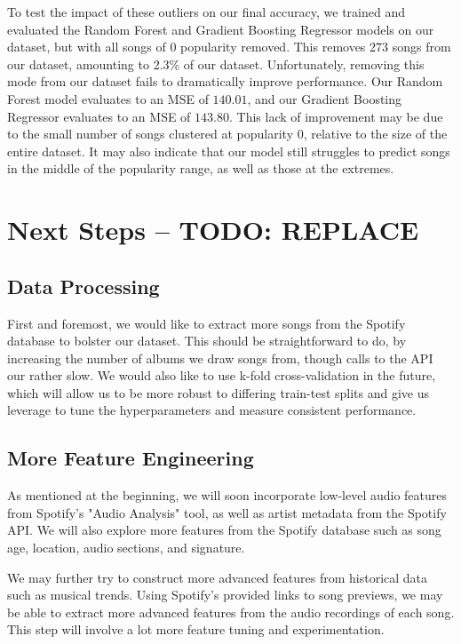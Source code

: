 \documentclass[journal]{IEEEtran}
\begin{document}
To test the impact of these outliers on our final accuracy, we trained and evaluated the Random Forest and Gradient Boosting Regressor models on our dataset, but with all songs of 0 popularity removed. This removes 273 songs from our dataset, amounting to 2.3\% of our dataset. Unfortunately, removing this mode from our dataset fails to dramatically improve performance. Our Random Forest model evaluates to an MSE of $140.01$, and our Gradient Boosting Regressor evaluates to an MSE of $143.80$. This lack of improvement may be due to the small number of songs clustered at popularity 0, relative to the size of the entire dataset. It may also indicate that our model still struggles to predict songs in the middle of the popularity range, as well as those at the extremes.


\section{Next Steps -- TODO: REPLACE}

\subsection{Data Processing}
First and foremost, we would like to extract more songs from the Spotify database to bolster our dataset. This should be straightforward to do, by increasing the number of albums we draw songs from, though calls to the API our rather slow. We would also like to use k-fold cross-validation in the future, which will allow us to be more robust to differing train-test splits and give us leverage to tune the hyperparameters and measure consistent performance.

\subsection{More Feature Engineering}
As mentioned at the beginning, we will soon incorporate low-level audio features from Spotify's "Audio Analysis" tool, as well as artist metadata from the Spotify API. We will also explore more features from the Spotify database such as song age, location, audio sections, and signature.

We may further try to construct more advanced features from historical data such as musical trends. Using Spotify's provided links to song previews, we may be able to extract more advanced features from the audio recordings of each song. This step will involve a lot more feature tuning and experimentation.
\end{document}

